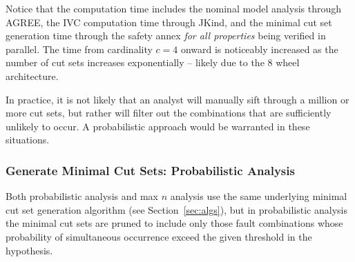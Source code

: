 Notice that the computation time includes the nominal model analysis through AGREE, the IVC computation time through JKind, and the minimal cut set generation time through the safety annex {\em for all properties} being verified in parallel. The time from cardinality $c = 4$ onward is noticeably increased as the number of cut sets increases exponentially -- likely due to the 8 wheel architecture. 

In practice, it is not likely that an analyst will manually sift through a million or more cut sets, but rather will filter out the combinations that are sufficiently unlikely to occur. A probabilistic approach would be warranted in these situations. 

\subsubsection{Generate Minimal Cut Sets: Probabilistic Analysis}
\label{sec:prob_generate}
Both probabilistic analysis and max $n$ analysis use the same underlying minimal cut set generation algorithm (see Section~\ref{sec:algs}), but in probabilistic analysis the minimal cut sets are pruned to include only those fault combinations whose probability of simultaneous occurrence exceed the given threshold in the hypothesis. 

